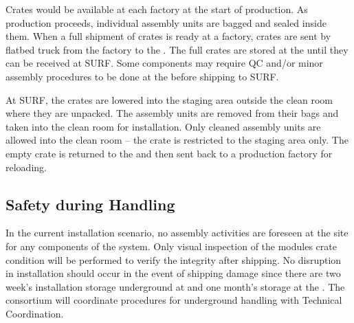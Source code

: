 Crates would be available at each factory at the start of production. %
As production proceeds, individual assembly units are bagged and sealed inside them.
When a full shipment of crates is ready at a factory, crates are sent by flatbed truck from the factory to the .  The full crates are stored at the  until they can be received at SURF.  Some components may require QC and/or minor assembly procedures to be done at the  before shipping to SURF.

At SURF, the crates are lowered into the staging area outside the clean room where they are unpacked. The assembly units are removed from their bags and taken into the clean room for installation. Only cleaned assembly units are allowed into the clean room -- the crate is restricted to the staging area only. The empty crate is returned to the  and then sent back to a production factory for reloading. 


\subsection{Safety during Handling} %
\label{sec:fdsp-hv-transport-safety}


In the current installation scenario, no assembly activities are foreseen at the  site for any components of the  system. Only visual inspection of the  modules crate condition will be performed to verify the integrity after shipping. %
No disruption in installation should occur in the event of shipping damage since there are two week's installation storage underground at \surf and one month's storage at the .  The  consortium will coordinate procedures for underground handling with Technical Coordination.

